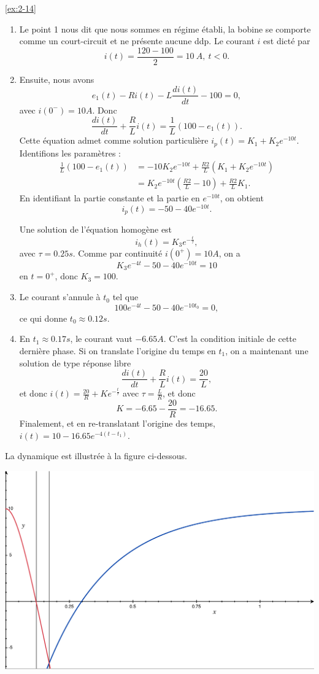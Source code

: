 \begin{solexercise}{\ref{ex:2-14}}
	\label{solex:2-14}
\begin{enumerate}
	\item Le point 1 nous dit que nous sommes en r\'egime \'etabli, la bobine se comporte comme un court-circuit et ne pr\'esente aucune ddp. Le courant $i$ est dict\'e par 
	$$i(t) = \frac{120-100}{2} = 10 \ A, \ t < 0.$$
	\item Ensuite, nous avons 
	$$e_1(t) - R i(t) - L \frac{di(t)}{dt} - 100 = 0,$$
	avec $i(0^-) = 10 A$.
	Donc 
	$$\frac{di(t)}{dt} + \frac{R}{L} i(t)  = \frac{1}{L} (100 - e_1(t)).$$
	Cette \'equation admet comme solution particuli\`ere $i_p(t) = K_1 + K_2 e^{-10t}$.
	Identifions les param\`etres :
	\begin{align*}
	\frac{1}{L} (100 - e_1(t)) &= -10 K_2 e^{-10t} + \frac{R2}{L} (K_1 + K_2 e^{-10t}) \\
	&= K_2 e^{-10t} (\frac{R2}{L} -10 ) + \frac{R2}{L} K_1.
	\end{align*}
	En identifiant la partie constante et la partie en $e^{-10t}$, on obtient 
	$$i_p(t) = -50-40 e^{-10t}.$$
	
	Une solution de l'\'equation homog\`ene est $$i_h(t) = K_3 e^{-\frac{t}{\tau}},$$  avec $\tau = 0.25 s$. Comme par continuit\'e $i(0^+) = 10 A$, on a
	$$K_3 e^{-4t} -50-40 e^{-10t} = 10$$
	en $t = 0^+$, donc $K_3 = 100$.
	\item 
	Le courant s'annule \`a $t_0$ tel que $$100 e^{-4t} -50-40 e^{-10t_0} = 0,$$
	ce qui donne $t_0 \approx 0.12 s$. 
	\item En $t_1 \approx 0.17s$, le courant vaut $-6.65 A$. C'est la condition initiale de cette derni\`ere phase. Si on translate l'origine du temps en $t_1$, on a maintenant une solution de type r\'eponse libre
	$$\frac{di(t)}{dt} + \frac{R}{L} i(t)  = \frac{20}{L},$$
	et donc $i(t) = \frac{20}{R} + K e^{-\frac{t}{\tau}}$ avec $\tau = \frac{L}{R}$, et donc $$K = -6.65 - \frac{20}{R} = -16.65.$$
	Finalement, et en re-translatant l'origine des temps,  $i(t) = 10 - 16.65 e^{-4(t-t_1)}$.
\end{enumerate}
La dynamique est illustr\'ee \`a la figure ci-dessous.
\begin{center}
\includegraphics[width=0.7\linewidth]{figs/ex_RLC}
\end{center}

\end{solexercise}